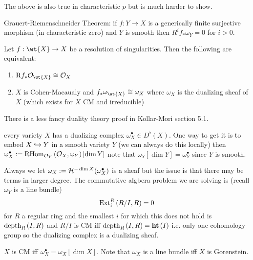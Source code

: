 \documentclass[12pt]{article}
\newcommand{\R}{\mathrm{R}}
\begin{document}
\begin{rmk}
The above is also true in characteristic $p$ but is much harder to show.
\end{rmk}

\begin{exercise}
Grauert-Riemenschneider Theorem: if $f : Y \to X$ is a generically finite surjective morphism (in characteristic zero) and $Y$ is smooth then $R^i f_* \omega_Y = 0$ for $i > 0$. 
\end{exercise}
 
\begin{prop}
Let $f : \wt{X} \to X$ be a resolution of singularities. Then the following are equivalent:
\begin{enumerate}
\item $\R f_* \struct{\wt{X}} \cong \struct{X}$ 
\item $X$ is Cohen-Macaualy and $f_* \omega_{\wt{X}} \cong \omega_X$ where $\omega_X$ is the dualizing sheaf of $X$ (which exists for $X$ CM and irreducible)
\end{enumerate}
\end{prop}

\begin{rmk}
There is a less fancy duality theory proof in Kollar-Mori section 5.1. 
\end{rmk}

\begin{prop}
every variety $X$ has a dualizing complex $\omega_X^\bullet \in D^\flat(X)$. One way to get it is to embed $X \hookrightarrow Y$ in a smooth variety $Y$ (we can always do this locally) then $\omega_X^\bullet := \mathrm{RHom}_{\mathcal{O}_{Y}} \left( \mathcal{O}_{X}, \omega_Y \right)[\dim{Y}]$ note that $\omega_Y[\dim{Y}] = \omega_Y^\bullet$ since $Y$ is smooth. 
\end{prop} 
 
\begin{rmk}
Always we let $\omega_X := \mathcal{H}^{-\dim{X}}(\omega_X^\bullet)$ is a sheaf but the issue is that there may be terms in larger degree. The commutative algbera problem we are solving is (recall $\omega_Y$ is a line bundle)
\[ \mathrm{Ext}^{R}_{i} \left( R/I, R \right) = 0 \]
for $R$ a regular ring and the smallest $i$ for which this does not hold is $\mathrm{depth}_{R} \left( I,R \right)$ and $R/I$ is CM iff $\mathrm{depth}_{R} \left( I,R \right) = \mathbf{ht}\left( I \right)$ i.e. only one cohomology group so the dualizing complex is a dualizing sheaf. 
\end{rmk}
 
\begin{lemma}
$X$ is CM iff $\omega_X^\bullet = \omega_X[\dim{X}]$. Note that $\omega_X$ is a line bundle iff $X$ is Gorenstein. 
\end{lemma}
\end{document}
